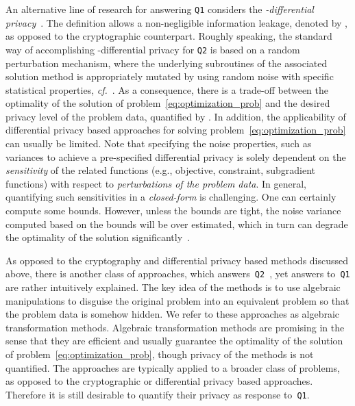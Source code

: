 \documentclass[12pt,draftcls,onecolumn]{IEEEtran}
\newcommand{\cf}{{\textit{cf.}}}
\newcommand{\addnew}[1]{{{\color{blue!0!black}#1}}}
\begin{document}
\addnew
{
An alternative line of research for answering \texttt{Q1} considers the \emph{-differential privacy}~\cite{Dwork-McSherry-Nissim-Smith-2006}. The definition allows a non-negligible
information leakage, denoted by , as opposed to the cryptographic counterpart. Roughly speaking, the standard way of accomplishing -differential privacy for \texttt{Q2} is based on a random perturbation mechanism, where the underlying subroutines of the associated solution method is appropriately mutated by using random noise with specific statistical properties, \cf~\cite{Chaudhuri-Monteleoni-Sarwate-2011,Kifer-Smith-Thakurta-2012,Guptaetal-2010,Ny-Pappas-CDC-2013,Ny-Pappas-Alerton-2013,Huang-Mitra-Vaidya-2014}. As a consequence, there is a trade-off between the optimality of the solution of problem~\eqref{eq:optimization_prob} and the desired privacy level of the problem data, quantified by . In addition, the applicability of differential privacy based approaches for solving problem~\eqref{eq:optimization_prob} can usually be limited. Note that specifying the noise properties, such as variances to achieve a pre-specified differential privacy is solely dependent on the \emph{sensitivity} of the related functions (e.g., objective, constraint, subgradient functions) with respect to \emph{perturbations of the problem data}. In general, quantifying such sensitivities in a \emph{closed-form} is challenging. One can certainly compute some bounds. However, unless the bounds are tight, the noise variance computed based on the bounds will be over estimated, which in turn can degrade the optimality of the solution significantly~\cite{Dwork-McSherry-Nissim-Smith-2006,Chaudhuri-Monteleoni-Sarwate-2011,Huang-Mitra-Vaidya-2014}.


}

\addnew{
As opposed to the cryptography and differential privacy based methods discussed above, there is another class of approaches, which answers~\texttt{Q2}~\cite{Mangasarian-OptLet-2011,Mangasarian-OptMethSW-2011,Mangasarian-OptLet-2012,Mangasarian-Wild-2008,Mangasarian-Wild-Fung-2008,Bednarz-2012,Dreier-Kerschbaum-2011,Bednarz-Bean-Roughan-2009,Wang-Ren-Wang-11}, yet answers to~\texttt{Q1} are rather intuitively explained. The key idea of the methods is to use algebraic manipulations to disguise the original problem into an equivalent problem so that the problem data  is somehow hidden. We refer to these approaches as algebraic transformation methods. Algebraic transformation methods are promising in the sense that they are efficient and usually guarantee the optimality of the solution of problem~\eqref{eq:optimization_prob}, though privacy of the methods is not quantified. The approaches are typically applied to a broader class of problems, as opposed to the cryptographic or differential privacy based approaches. Therefore it is still desirable to quantify their privacy as response to~\texttt{Q1}.
}
\end{document}
